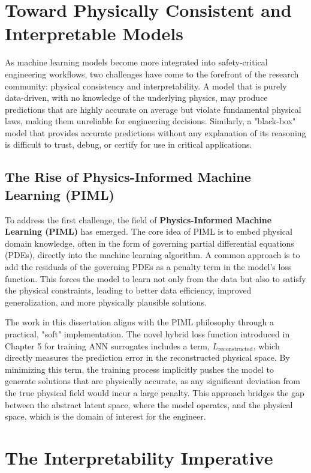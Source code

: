 \documentclass[dscexam, EN]{ufabcFHZh}
\begin{document}
\section{Toward Physically Consistent and Interpretable Models}

As machine learning models become more integrated into safety-critical engineering workflows, two challenges have come to the forefront of the research community: physical consistency and interpretability. A model that is purely data-driven, with no knowledge of the underlying physics, may produce predictions that are highly accurate on average but violate fundamental physical laws, making them unreliable for engineering decisions. Similarly, a "black-box" model that provides accurate predictions without any explanation of its reasoning is difficult to trust, debug, or certify for use in critical applications.


\subsection{The Rise of Physics-Informed Machine Learning (PIML)}

To address the first challenge, the field of \textbf{Physics-Informed Machine Learning (PIML)} has emerged. The core idea of PIML is to embed physical domain knowledge, often in the form of governing partial differential equations (PDEs), directly into the machine learning algorithm. A common approach is to add the residuals of the governing PDEs as a penalty term in the model's loss function. This forces the model to learn not only from the data but also to satisfy the physical constraints, leading to better data efficiency, improved generalization, and more physically plausible solutions.

The work in this dissertation aligns with the PIML philosophy through a practical, "soft" implementation. The novel hybrid loss function introduced in Chapter 5 for training ANN surrogates includes a term, $L_{\text{reconstructed}}$, which directly measures the prediction error in the reconstructed physical space. By minimizing this term, the training process implicitly pushes the model to generate solutions that are physically accurate, as any significant deviation from the true physical field would incur a large penalty. This approach bridges the gap between the abstract latent space, where the model operates, and the physical space, which is the domain of interest for the engineer.


\section{The Interpretability Imperative}
\end{document}
